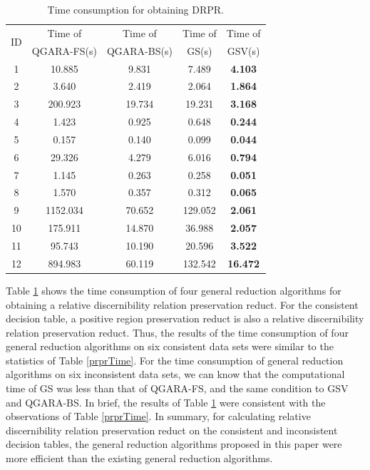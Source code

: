 \documentclass[review]{elsarticle}
\begin{document}
		\begin{table}[htb]
			\centering
			\caption{Time consumption for obtaining DRPR.}
			\label{drprTime}
			\begin{tabular}{ccccc}
				\hline
				\multirow{2}{*}{ID} & Time of     & Time of & Time of     & Time of \\
				& QGARA-FS(s) & QGARA-BS(s)   & GS(s) & GSV(s)  \\ \hline
				1   & 10.885  & 9.831  & 7.489    & \textbf{4.103} \\
				2   & 3.640    & 2.419  & 2.064    & \textbf{1.864} \\
				3   & 200.923 & 19.734 & 19.231   & \textbf{3.168} \\
				4   & 1.423   & 0.925  & 0.648    & \textbf{0.244} \\
				5   & 0.157   & 0.140   & 0.099    & \textbf{0.044} \\
				6   & 29.326  & 4.279  & 6.016    & \textbf{0.794} \\
				7   & 1.145   & 0.263  & 0.258    & \textbf{0.051} \\
				8   & 1.570    & 0.357  & 0.312    & \textbf{0.065} \\
				9   & 1152.034& 70.652 & 129.052  & \textbf{2.061} \\
				10  & 175.911 & 14.870 & 36.988   & \textbf{2.057} \\
				11  & 95.743  & 10.190 & 20.596   & \textbf{3.522} \\
				12  & 894.983 & 60.119 & 132.542  & \textbf{16.472} \\ \hline
			\end{tabular}
		\end{table}
		\par Table \ref{drprTime} shows the time consumption of four general reduction algorithms for obtaining a relative discernibility relation preservation reduct. For the consistent decision table, a positive region preservation reduct is also a relative discernibility relation preservation reduct. Thus, the results of the time consumption of four general reduction algorithms on six consistent data sets were similar to the statistics of Table \ref{prprTime}. For the time consumption of general reduction algorithms on six inconsistent data sets, we can know that the computational time of GS was less than that of QGARA-FS, and the same condition to GSV and QGARA-BS. In brief, the results of Table \ref{drprTime} were consistent with the observations of Table \ref{prprTime}. In summary, for calculating relative discernibility relation preservation reduct on the consistent and inconsistent decision tables, the general reduction algorithms proposed in this paper were more efficient than the existing general reduction algorithms. 
\end{document}
